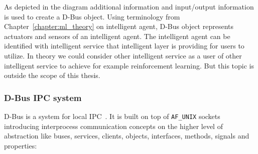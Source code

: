 \documentclass[english, 12pt, a4paper, elec, utf8, online]{aaltothesis}
\begin{document}
As depicted in the diagram additional information and input/output information is used to create a D-Bus object. Using terminology from Chapter~\ref{chapter:ml_theory} on intelligent agent, D-Bus object represents actuators and sensors of an intelligent agent. The intelligent agent can be identified with intelligent service that intelligent layer is providing for users to utilize. In theory we could consider other intelligent service as a user of other intelligent service to achieve for example reinforcement learning. But this topic is outside the scope of this thesis.           

\subsubsection{D-Bus IPC system}
D-Bus is a system for local IPC~\cite{dbus_spec}. It is built on top of \texttt{AF\_UNIX} sockets introducing interprocess communication concepts on the higher level of abstraction  like buses, services, clients, objects, interfaces, methods, signals and properties:  
    
\end{document}
